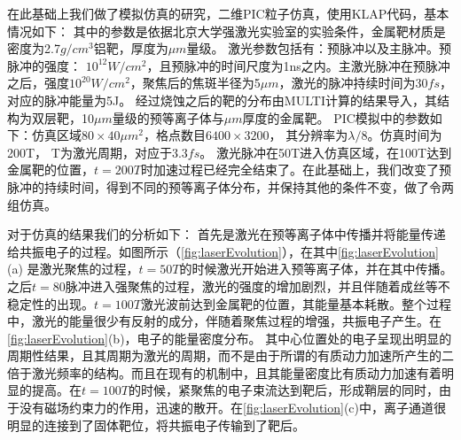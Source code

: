 在此基础上我们做了模拟仿真的研究，二维PIC粒子仿真，使用KLAP代码，基本情况如下：
其中的参数是依据北京大学强激光实验室的实验条件，金属靶材质是密度为2.7$g/cm^3$铝靶，厚度为$\mu m$量级。 激光参数包括有：预脉冲以及主脉冲。预脉冲的强度： $10^12W/cm^2$，且预脉冲的时间尺度为1ns之内。主激光脉冲在预脉冲之后，强度$10^20W/cm^2$，聚焦后的焦斑半径为5$\mu m$，激光的脉冲持续时间为$30fs$，对应的脉冲能量为5J。   经过烧蚀之后的靶的分布由MULTI计算的结果导入，其结构为双层靶，10$\mu  m$量级的预等离子体与$\mu m$厚度的金属靶。 PIC模拟中的参数如下：仿真区域$80 \times 40 \mu m^2$，格点数目$6400 \times 3200$， 其分辨率为$\lambda / 8$。仿真时间为200T， T为激光周期，对应于$3.3fs$。 激光脉冲在50T进入仿真区域，在100T达到金属靶的位置，$t=200T$时加速过程已经完全结束了。在此基础上，我们改变了预脉冲的持续时间，得到不同的预等离子体分布，并保持其他的条件不变，做了令两组仿真。

对于仿真的结果我们的分析如下：
首先是激光在预等离子体中传播并将能量传递给共振电子的过程。如图所示（\ref{fig:laserEvolution}），在其中\ref{fig:laserEvolution}(a) 是激光聚焦的过程，$t=50T$的时候激光开始进入预等离子体，并在其中传播。之后$t=80$脉冲进入强聚焦的过程，激光的强度的增加剧烈，并且伴随着成丝等不稳定性的出现。$t=100T$激光波前达到金属靶的位置，其能量基本耗散。整个过程中，激光的能量很少有反射的成分，伴随着聚焦过程的增强，共振电子产生。在\ref{fig:laserEvolution}(b)，电子的能量密度分布。 其中心位置处的电子呈现出明显的周期性结果，且其周期为激光的周期，而不是由于所谓的有质动力加速所产生的二倍于激光频率的结构。而且在现有的机制中，且其能量密度比有质动力加速有着明显的提高。在$t=100T$的时候，紧聚焦的电子束流达到靶后，形成鞘层的同时，由于没有磁场约束力的作用，迅速的散开。在\ref{fig:laserEvolution}(c)中，离子通道很明显的连接到了固体靶位，将共振电子传输到了靶后。










